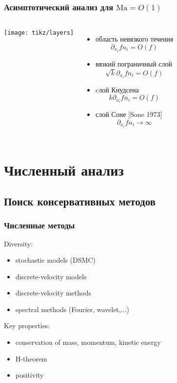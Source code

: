 \documentclass[mathserif]{beamer} %
\newcommand{\Ma}{\mathrm{Ma}}
\newcommand{\pder}[2][]{\partial_{#2}{#1}}
\newcommand{\OO}[1]{O(#1)}
\begin{document}
\begin{frame}
    \frametitle{Асимптотический анализ для \(\Ma = \OO{1}\)}
   	\begin{columns}
		\begin{center}
		    \vspace{-27pt}
			\texttt{[image: tikz/layers]}
		\end{center}
		\vspace{-10pt}
		\begin{itemize}
			\item область невязкого течения \[ \pder[f]{x_i}n_i = \OO{f} \]
			\item вязкий пограничный слой \[ \sqrt{k}\pder[f]{x_i}n_i = \OO{f} \]
			\item cлой Кнудсена \[ k\pder[f]{x_i}n_i = \OO{f} \]
			\item слой Соне [Sone 1973] \[ \pder[f]{x_i}n_i \to \infty \]
		\end{itemize}
	\end{columns}
\end{frame}


\section{Численный анализ}

\subsection{Поиск консервативных методов}

\begin{frame}
    \frametitle{Численные методы}
    Diversity:
    \begin{itemize}
        \item stochastic models (DSMC)
        \item discrete-velocity models
        \item discrete-velocity methods
        \item spectral methods (Fourier, wavelet,...)
    \end{itemize}
    Key properties:
    \begin{itemize}
        \item conservation of mass, momentum, kinetic energy
        \item H-theorem
        \item positivity
    \end{itemize}
\end{frame}
\end{document}
